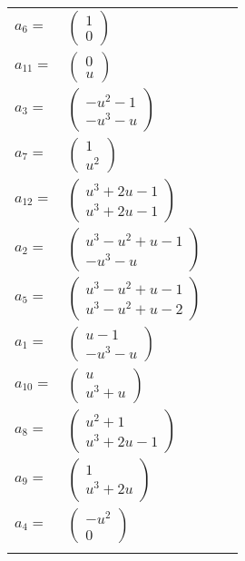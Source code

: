 \documentclass[1p]{elsarticle_modified}
\theoremstyle{definition}
\begin{document}
\begin{tabular}{m{7pt} m{180pt} m{7pt} m{180pt} }
\flushright $a_{6}=$&$\begin{pmatrix}1\\0\end{pmatrix}$ \\
\flushright $a_{11}=$&$\begin{pmatrix}0\\u\end{pmatrix}$ \\
\flushright $a_{3}=$&$\begin{pmatrix}- u^2-1\\- u^3- u\end{pmatrix}$ \\
\flushright $a_{7}=$&$\begin{pmatrix}1\\u^2\end{pmatrix}$ \\
\flushright $a_{12}=$&$\begin{pmatrix}u^3+2 u-1\\u^3+2 u-1\end{pmatrix}$ \\
\flushright $a_{2}=$&$\begin{pmatrix}u^3- u^2+u-1\\- u^3- u\end{pmatrix}$ \\
\flushright $a_{5}=$&$\begin{pmatrix}u^3- u^2+u-1\\u^3- u^2+u-2\end{pmatrix}$ \\
\flushright $a_{1}=$&$\begin{pmatrix}u-1\\- u^3- u\end{pmatrix}$ \\
\flushright $a_{10}=$&$\begin{pmatrix}u\\u^3+u\end{pmatrix}$ \\
\flushright $a_{8}=$&$\begin{pmatrix}u^2+1\\u^3+2 u-1\end{pmatrix}$ \\
\flushright $a_{9}=$&$\begin{pmatrix}1\\u^3+2 u\end{pmatrix}$ \\
\flushright $a_{4}=$&$\begin{pmatrix}- u^2\\0\end{pmatrix}$\\&\end{tabular}
\end{document}

